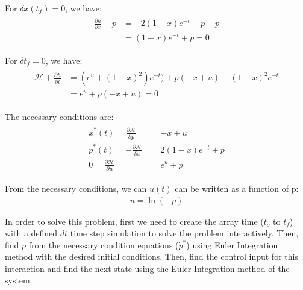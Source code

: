 \documentclass{article}
\begin{document}
For $\delta x(t_f)=0$, we have:
\begin{eqnarray*}
\begin{split}
\frac{\partial h}{\partial x} - p &= -2(1-x)e^{-t}-p - p \\
&= (1-x)e^{-t}+p = 0
\end{split}
\end{eqnarray*}

For $\delta t_f=0$, we have:
\begin{eqnarray*}
\begin{split}
\mathcal{H}+\frac{\partial h}{\partial t} &= (e^u+(1-x)^2)e^{-t})+p(-x+u) -(1-x)^2e^{-t} \\
&= e^u+p(-x+u) = 0
\end{split}
\end{eqnarray*}

The necessary conditions are:
\begin{eqnarray}
\begin{split}
\dot{x}^*(t) = \frac{\partial \mathcal{H}}{\partial p} &= -x+u \\
\dot{p}^*(t) = -\frac{\partial \mathcal{H}}{\partial x} &= 2(1-x)e^{-t}+p \\
0 = \frac{\partial \mathcal{H}}{\partial u} &= e^u+p
\end{split}
\end{eqnarray}

From the necessary conditions, we can $u(t)$ can be written as a function of p: 
\begin{eqnarray*}
u = \ln(-p)
\end{eqnarray*}

In order to solve this problem, first we need to create the array time ($t_o$ to $t_f$) with a defined $dt$ time step simulation to solve the problem interactively. Then, find $p$ from the necessary condition equations ($\dot{p}^*$)  using Euler Integration method with the desired initial conditions. Then, find the control input for this interaction and find the next state using the Euler Integration method of the system. 
\end{document}
